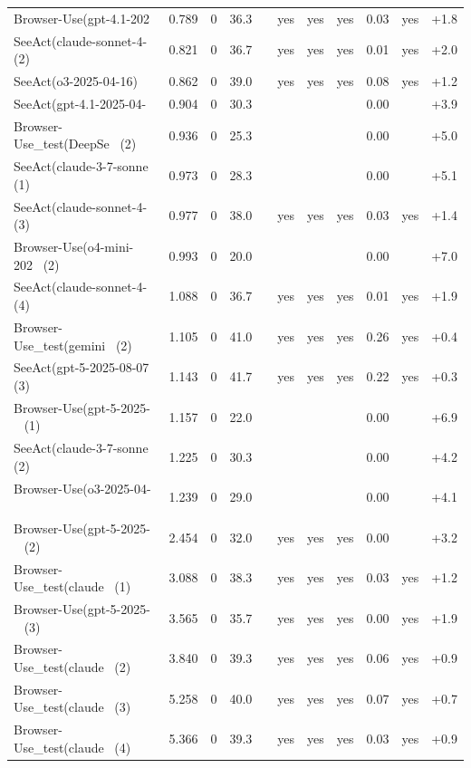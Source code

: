 {\begin{longtable}{lrrrcccccrr}
Browser-Use(gpt-4.1-202~ & 0.789 & 0 & 36.3 &  & yes & yes & yes & 0.03 & yes & +1.8 \\
SeeAct(claude-sonnet-4-~ (2) & 0.821 & 0 & 36.7 &  & yes & yes & yes & 0.01 & yes & +2.0 \\
SeeAct(o3-2025-04-16) & 0.862 & 0 & 39.0 &  & yes & yes & yes & 0.08 & yes & +1.2 \\
SeeAct(gpt-4.1-2025-04-~ & 0.904 & 0 & 30.3 &  &  &  &  & 0.00 &  & +3.9 \\
Browser-Use\_test(DeepSe~ (2) & 0.936 & 0 & 25.3 &  &  &  &  & 0.00 &  & +5.0 \\
SeeAct(claude-3-7-sonne~ (1) & 0.973 & 0 & 28.3 &  &  &  &  & 0.00 &  & +5.1 \\
SeeAct(claude-sonnet-4-~ (3) & 0.977 & 0 & 38.0 &  & yes & yes & yes & 0.03 & yes & +1.4 \\
Browser-Use(o4-mini-202~ (2) & 0.993 & 0 & 20.0 &  &  &  &  & 0.00 &  & +7.0 \\
SeeAct(claude-sonnet-4-~ (4) & 1.088 & 0 & 36.7 &  & yes & yes & yes & 0.01 & yes & +1.9 \\
Browser-Use\_test(gemini~ (2) & 1.105 & 0 & 41.0 &  & yes & yes & yes & 0.26 & yes & +0.4 \\
SeeAct(gpt-5-2025-08-07~ (3) & 1.143 & 0 & 41.7 &  & yes & yes & yes & 0.22 & yes & +0.3 \\
Browser-Use(gpt-5-2025-~ (1) & 1.157 & 0 & 22.0 &  &  &  &  & 0.00 &  & +6.9 \\
SeeAct(claude-3-7-sonne~ (2) & 1.225 & 0 & 30.3 &  &  &  &  & 0.00 &  & +4.2 \\
Browser-Use(o3-2025-04-~ & 1.239 & 0 & 29.0 &  &  &  &  & 0.00 &  & +4.1 \\
Browser-Use(gpt-5-2025-~ (2) & 2.454 & 0 & 32.0 &  & yes & yes & yes & 0.00 &  & +3.2 \\
Browser-Use\_test(claude~ (1) & 3.088 & 0 & 38.3 &  & yes & yes & yes & 0.03 & yes & +1.2 \\
Browser-Use(gpt-5-2025-~ (3) & 3.565 & 0 & 35.7 &  & yes & yes & yes & 0.00 & yes & +1.9 \\
Browser-Use\_test(claude~ (2) & 3.840 & 0 & 39.3 &  & yes & yes & yes & 0.06 & yes & +0.9 \\
Browser-Use\_test(claude~ (3) & 5.258 & 0 & 40.0 &  & yes & yes & yes & 0.07 & yes & +0.7 \\
Browser-Use\_test(claude~ (4) & 5.366 & 0 & 39.3 &  & yes & yes & yes & 0.03 & yes & +0.9 \\
\end{longtable}

}
